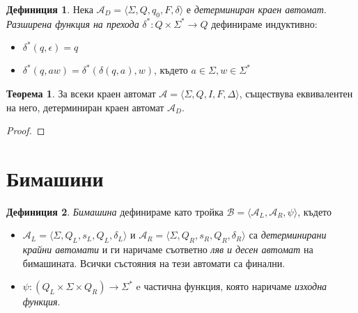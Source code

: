 \documentclass[11pt, oneside]{article}
\theoremstyle{definition}
\newtheorem{definition}{Дефиниция}[section]
\newtheorem{theorem}{Теорема}[section]
\begin{document}
\begin{definition}
	Нека \( \mathcal{A}_D = \langle \Sigma, Q, q_0, F, \delta \rangle \) е \emph{детерминиран краен автомат}. \emph{Разширена функция на прехода} \( \delta^*: Q \times \Sigma^* \to Q \) дефинираме индуктивно:

	\begin{itemize}
		\item \( \delta^*(q, \epsilon) = q \)
		\item \( \delta^*(q, aw) = \delta^*(\delta(q, a), w) \), където \( a \in \Sigma, w \in \Sigma^* \)
	\end{itemize}
\end{definition}

\begin{theorem}
	За всеки краен автомат \(\mathcal{A} = \langle \Sigma, Q, I, F, \Delta \rangle \), съществува еквивалентен на него, детерминиран краен автомат \( \mathcal{A}_D \).
	\begin{proof}
		
	\end{proof}
\end{theorem}

\section{Бимашини}

\begin{definition}
	 \emph{Бимашина} дефинираме като тройка \( \mathcal{B} = \langle \mathcal{A}_L, \mathcal{A}_R, \psi \rangle \), където

	\begin{itemize}
		\item \( \mathcal{A}_L = \langle \Sigma, Q_L, s_L, Q_L, \delta_L \rangle \) и \( \mathcal{A}_R = \langle \Sigma, Q_R, s_R, Q_R, \delta_R \rangle \) са \emph{детерминирани крайни автомати} и ги наричаме съответно \emph{ляв и десен автомат} на бимашината. Всички състояния на тези автомати са финални.
		\item \( \psi:(Q_L \times \Sigma \times Q_R) \to \Sigma^* \) e частична функция, която наричаме \emph{изходна функция}.
	\end{itemize}
\end{definition}
\end{document}
